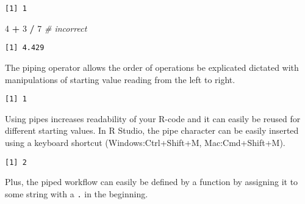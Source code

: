 \documentclass[12pt,]{article}
\newenvironment{Shaded}{\begin{snugshade}}{\end{snugshade}}
\newcommand{\DecValTok}[1]{\textcolor[rgb]{0.00,0.00,0.81}{#1}}
\newcommand{\StringTok}[1]{\textcolor[rgb]{0.31,0.60,0.02}{#1}}
\newcommand{\CommentTok}[1]{\textcolor[rgb]{0.56,0.35,0.01}{\textit{#1}}}
\newcommand{\OperatorTok}[1]{\textcolor[rgb]{0.81,0.36,0.00}{\textbf{#1}}}
\newcommand{\NormalTok}[1]{#1}
\theoremstyle{definition}
\theoremstyle{definition}
\theoremstyle{definition}
\theoremstyle{remark}
\begin{document}
\begin{verbatim}
[1] 1
\end{verbatim}

\begin{Shaded}
\begin{Highlighting}[]
\DecValTok{4} \OperatorTok{+}\StringTok{ }\DecValTok{3} \OperatorTok{/}\StringTok{ }\DecValTok{7} \CommentTok{# incorrect}
\end{Highlighting}
\end{Shaded}

\begin{verbatim}
[1] 4.429
\end{verbatim}

The piping operator allows the order of operations be explicated
dictated with manipulations of starting value reading from the left to
right.

\begin{Shaded}
\end{Shaded}

\begin{verbatim}
[1] 1
\end{verbatim}

Using pipes increases readability of your R-code and it can easily be
reused for different starting values. In R Studio, the pipe character
can be easily inserted using a keyboard shortcut (Windows:Ctrl+Shift+M,
Mac:Cmd+Shift+M).

\begin{Shaded}
\end{Shaded}

\begin{verbatim}
[1] 2
\end{verbatim}

Plus, the piped workflow can easily be defined by a function by
assigning it to some string with a \texttt{.} in the beginning.
\end{document}
